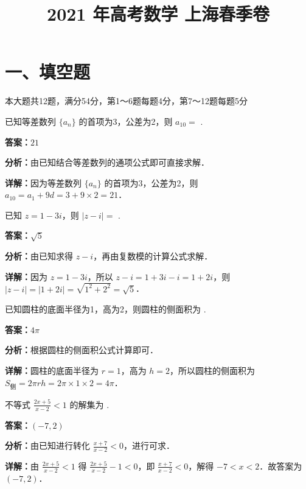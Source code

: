 ﻿\title{2021 年高考数学 上海春季卷}
\date{}
\maketitle

\section*{一、填空题}
本大题共12题，满分54分，第1～6题每题4分，第7～12题每题5分

\begin{question}[points=4]
已知等差数列 $\{a_n\}$ 的首项为3，公差为2，则 $a_{10}=$  .
\fillin[{$21$}]
\begin{solution}
\textbf{答案：}$21$

\textbf{分析：}由已知结合等差数列的通项公式即可直接求解．

\textbf{详解：}因为等差数列 $\{a_n\}$ 的首项为3，公差为2，则 $a_{10}=a_1+9d=3+9\times 2=21$．
\end{solution}
\end{question}

\begin{question}[points=4]
已知 $z=1-3i$，则 $|z-i|=$  .
\fillin[{$\sqrt{5}$}]
\begin{solution}
\textbf{答案：}$\sqrt{5}$

\textbf{分析：}由已知求得 $z-i$，再由复数模的计算公式求解．

\textbf{详解：}因为 $z=1-3i$，所以 $z-i=1+3i-i=1+2i$，则 $|z-i|=|1+2i|=\sqrt{1^2+2^2}=\sqrt{5}$．
\end{solution}
\end{question}

\begin{question}[points=4]
已知圆柱的底面半径为1，高为2，则圆柱的侧面积为  .
\fillin[{$4\pi$}]
\begin{solution}
\textbf{答案：}$4\pi$

\textbf{分析：}根据圆柱的侧面积公式计算即可．

\textbf{详解：}圆柱的底面半径为 $r=1$，高为 $h=2$，所以圆柱的侧面积为 $S_{\text{侧}}=2\pi rh=2\pi\times 1\times 2=4\pi$．
\end{solution}
\end{question}

\begin{question}[points=4]
不等式 $\frac{2x+5}{x-2}<1$ 的解集为  .
\fillin[{$(-7,2)$}]
\begin{solution}
\textbf{答案：}$(-7,2)$

\textbf{分析：}由已知进行转化 $\frac{x+7}{x-2}<0$，进行可求．

\textbf{详解：}由 $\frac{2x+5}{x-2}<1$ 得 $\frac{2x+5}{x-2}-1<0$，即 $\frac{x+7}{x-2}<0$，解得 $-7<x<2$．故答案为 $(-7,2)$．
\end{solution}
\end{question}

